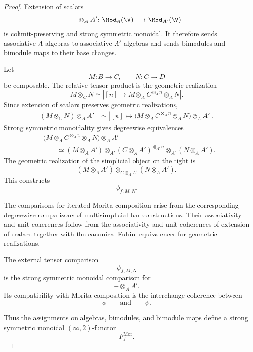 \begin{proof}
Extension of scalars
\[
    -\otimes_A A'
    \colon
    \Mod_A(\V)
    \longrightarrow
    \Mod_{A'}(\V)
\]
is colimit-preserving and strong symmetric monoidal. It therefore sends
associative $A$-algebras to associative $A'$-algebras and sends
bimodules and bimodule maps to their base changes.

Let
\[
    M
    \colon
    B
    \longrightarrow
    C,
    \qquad
    N
    \colon
    C
    \longrightarrow
    D
\]
be composable. The relative tensor product is the geometric realization
\[
    M\otimes_C N
    \simeq
    \left|
        [n]
        \longmapsto
        M\otimes_A C^{\otimes_A n}\otimes_A N
    \right|.
\]
Since extension of scalars preserves geometric realizations,
\[
\begin{aligned}
    (M\otimes_C N)\otimes_A A'
    &\simeq
    \left|
        [n]
        \longmapsto
        \bigl(
            M\otimes_A C^{\otimes_A n}\otimes_A N
        \bigr)
        \otimes_A A'
    \right|.
\end{aligned}
\]
Strong symmetric monoidality gives degreewise equivalences
\[
\begin{aligned}
    &
    \bigl(
        M\otimes_A C^{\otimes_A n}\otimes_A N
    \bigr)
    \otimes_A A'
    \\
    &\qquad\simeq
    (M\otimes_A A')
    \otimes_{A'}
    (C\otimes_A A')^{\otimes_{A'}n}
    \otimes_{A'}
    (N\otimes_A A').
\end{aligned}
\]
The geometric realization of the simplicial object on the right is
\[
    (M\otimes_A A')
    \otimes_{C\otimes_A A'}
    (N\otimes_A A').
\]
This constructs
\[
    \phi_{f;M,N}.
\]

The comparisons for iterated Morita composition arise from the
corresponding degreewise comparisons of multisimplicial bar
constructions. Their associativity and unit coherences follow from the
associativity and unit coherences of extension of scalars together with
the canonical Fubini equivalences for geometric realizations.

The external tensor comparison
\[
    \psi_{f;M,N}
\]
is the strong symmetric monoidal comparison for
\[
    -\otimes_A A'.
\]
Its compatibility with Morita composition is the interchange coherence
between
\[
    \phi
    \qquad\text{and}\qquad
    \psi.
\]

Thus the assignments on algebras, bimodules, and bimodule maps define a
strong symmetric monoidal $(\infty,2)$-functor
\[
    F_f^{\mathrm{Mor}}.
\]


\end{proof}
